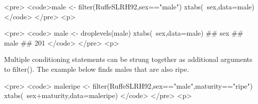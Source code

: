 <pre>
<code>male <- filter(RuffeSLRH92,sex=="male")
xtabs(~sex,data=male)
</code>
</pre>
<p>




<pre>
<code>
male <- droplevels(male)
xtabs(~sex,data=male)
## sex
## male 
##  201
</code>
</pre>
<p>


Multiple conditioning statements can be strung together as additional arguments to filter(). The example below finds males that are also ripe.

<pre>
<code>
maleripe <- filter(RuffeSLRH92,sex=="male",maturity=="ripe")
xtabs(~sex+maturity,data=maleripe)
</code>
</pre>
<p>


